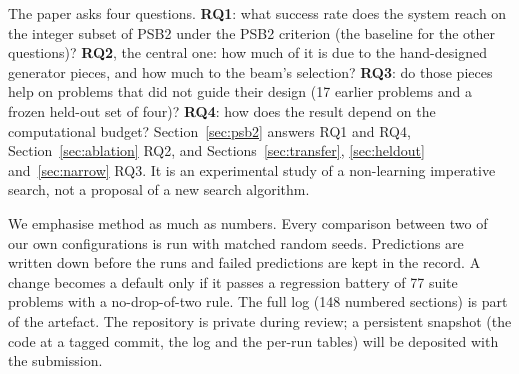 \documentclass[sigconf,nonacm]{acmart}
\begin{document}
The paper asks four questions. \textbf{RQ1}: what success rate does the system reach on the integer subset of PSB2 under the PSB2 criterion (the baseline for the other questions)? \textbf{RQ2}, the central one: how much of it is due to the hand-designed generator pieces, and how much to the beam's selection? \textbf{RQ3}: do those pieces help on problems that did not guide their design (17 earlier problems and a frozen held-out set of four)? \textbf{RQ4}: how does the result depend on the computational budget? Section~\ref{sec:psb2} answers RQ1 and RQ4, Section~\ref{sec:ablation} RQ2, and Sections~\ref{sec:transfer}, \ref{sec:heldout} and~\ref{sec:narrow} RQ3. It is an experimental study of a non-learning imperative search, not a proposal of a new search algorithm.

We emphasise method as much as numbers. Every comparison between two of our own configurations is run with matched random seeds. Predictions are written down before
the runs and failed predictions are kept in the record. A change becomes a default only if it passes a regression battery of 77
suite problems with a no-drop-of-two rule. The full log (148 numbered sections) is part of the artefact. The repository is private during review; a persistent snapshot (the code at a tagged commit, the log and the per-run tables) will be deposited with the submission.
\end{document}
